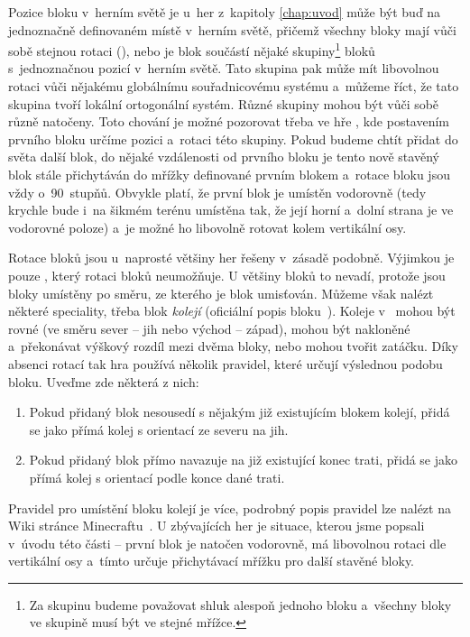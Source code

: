 Pozice bloku v~herním světě je u~her z~kapitoly \ref{chap:uvod} může být buď na jednoznačně definovaném místě v~herním světě, přičemž všechny bloky mají vůči sobě stejnou rotaci (\MC{}), nebo je blok součástí nějaké skupiny\footnote{Za skupinu budeme považovat shluk alespoň jednoho bloku a~všechny bloky ve skupině musí být ve stejné mřížce.} bloků s~jednoznačnou pozicí v~herním světě. Tato skupina pak může mít libovolnou rotaci vůči nějakému globálnímu souřadnicovému systému a~můžeme říct, že tato skupina tvoří lokální ortogonální systém. Různé skupiny mohou být vůči sobě různě natočeny. Toto chování je možné pozorovat třeba ve hře \ME{}, kde postavením prvního bloku určíme pozici a~rotaci této skupiny. Pokud budeme chtít přidat do světa další blok, do nějaké vzdálenosti od prvního bloku je tento nově stavěný blok stále přichytáván do mřížky definované prvním blokem a~rotace bloku jsou vždy o~90~stupňů. Obvykle platí, že první blok je umístěn vodorovně (tedy krychle bude i~na šikmém terénu umístěna tak, že její horní a~dolní strana je ve vodorovné poloze) a~je možné ho libovolně rotovat kolem vertikální osy.

Rotace bloků jsou u~naprosté většiny her řešeny v~zásadě podobně. Výjimkou je pouze \MC{}, který rotaci bloků neumožňuje. U většiny bloků to nevadí, protože jsou bloky umístěny po směru, ze kterého je blok umisťován. Můžeme však nalézt některé speciality, třeba blok \textit{kolejí} (oficiální popis bloku~\citep{mc_rail}). Koleje v~ mohou být rovné (ve směru sever -- jih nebo východ -- západ), mohou být nakloněné a~překonávat výškový rozdíl mezi dvěma bloky, nebo mohou tvořit zatáčku. Díky absenci rotací tak hra používá několik pravidel, které určují výslednou podobu bloku. Uveďme zde některá z nich:
\begin{enumerate}
	\item Pokud přidaný blok nesousedí s nějakým již existujícím blokem kolejí, přidá se jako přímá kolej s orientací ze severu na jih.
	\item Pokud přidaný blok přímo navazuje na již existující konec trati, přidá se jako přímá kolej s orientací podle konce dané trati.
\end{enumerate}
 Pravidel pro umístění bloku kolejí je více, podrobný popis pravidel lze nalézt na Wiki stránce Minecraftu~\citep{mc_rail}. U zbývajících her je situace, kterou jsme popsali v~úvodu této části -- první blok je natočen vodorovně, má libovolnou rotaci dle vertikální osy a~tímto určuje přichytávací mřížku pro další stavěné bloky.

